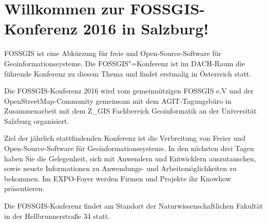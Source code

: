 \newpage
\section*{Willkommen zur FOSSGIS-Konferenz 2016 in Salzburg!} \label{welcome}
FOSSGIS ist eine Abkürzung für freie und Open-Source-Software für Geoinformationssysteme.
Die FOSSGIS"=Konferenz ist im DACH-Raum die führende Konferenz zu diesem Thema und findet erstmalig in Österreich statt.

Die FOSSGIS-Konferenz 2016 wird vom gemeinnützigen FOSSGIS e.V und der OpenStreetMap-Community gemeinsam
mit dem AGIT-Tagungsbüro in Zusammenarbeit mit dem Z\_GIS Fachbereich Geoinformatik an der Universität Salzburg organisiert.

Ziel der jährlich stattfindenden Konferenz ist die Verbreitung von Freier und Open-Source-Software für Geoinformationssysteme.
In den nächsten drei Tagen haben Sie die Gelegenheit, sich mit Anwendern und Entwicklern auszutauschen,
sowie neuste Informationen zu Anwen\-dungs- und Arbeitsmöglichkeiten zu bekommen. Im EXPO-Foyer werden Firmen und Projekte ihr Know\-how präsentieren.

Die FOSSGIS-Konferenz findet am Standort der Naturwissenschaftlichen Fakultät in der Hellbrunnerstraße 34 statt.

\newpage
